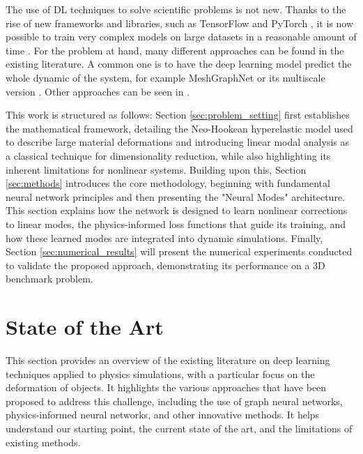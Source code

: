 The use of DL techniques to solve scientific problems is not new. Thanks to the rise of new frameworks and libraries, such as TensorFlow \cite{tensorflow2015-whitepaper} and PyTorch \cite{paszke2019pytorchimperativestylehighperformance}, it is now possible to train very complex models on large datasets in a reasonable amount of time \cite{tensorflow2015-whitepaper,paszke2019pytorchimperativestylehighperformance}. For the problem at hand, many different approaches can be found in the existing literature. A common one is to have the deep learning model predict the whole dynamic of the system, for example MeshGraphNet \cite{pfaffLearningMeshBasedSimulation2021a} or its multiscale version \cite{fortunatoMultiScaleMeshGraphNets2022}. Other approaches can be seen in \cite{jiangMeshfreeFlowNetPhysicsConstrainedDeep2020, hanPredictingPhysicsMeshreduced2022a}. 

This work is structured as follows: Section \ref{sec:problem_setting} first establishes the mathematical framework, detailing the Neo-Hookean hyperelastic model used to describe large material deformations and introducing linear modal analysis as a classical technique for dimensionality reduction, while also highlighting its inherent limitations for nonlinear systems. Building upon this, Section \ref{sec:methods} introduces the core methodology, beginning with fundamental neural network principles and then presenting the "Neural Modes" architecture. This section explains how the network is designed to learn nonlinear corrections to linear modes, the physics-informed loss functions that guide its training, and how these learned modes are integrated into dynamic simulations. Finally, Section \ref{sec:numerical_results} will present the numerical experiments conducted to validate the proposed approach, demonstrating its performance on a 3D benchmark problem.


\section*{State of the Art}

This section provides an overview of the existing literature on deep learning techniques applied to physics simulations, with a particular focus on the deformation of objects. It highlights the various approaches that have been proposed to address this challenge, including the use of graph neural networks, physics-informed neural networks, and other innovative methods. It helps understand our starting point, the current state of the art, and the limitations of existing methods.

